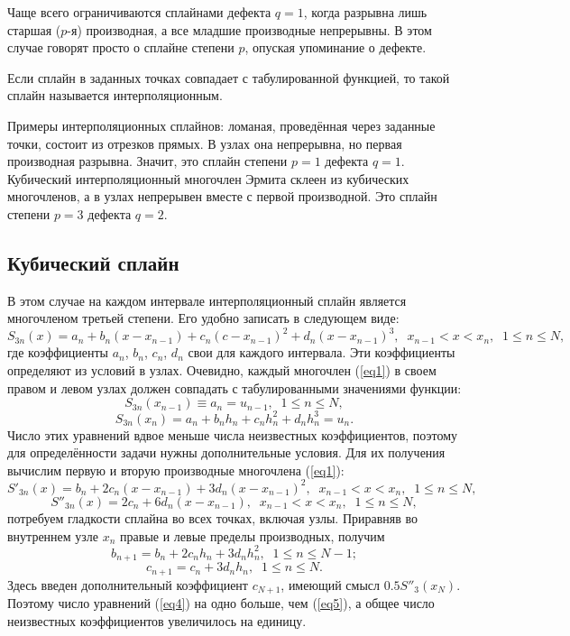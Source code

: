 \documentclass[
11pt,
master, %
subf, %
href, %
colorlinks=true, %
times, %
]{disser}
\begin{document}
Чаще всего ограничиваются сплайнами дефекта $q = 1$, когда разрывна лишь старшая ($p$-я) производная, а все младшие производные непрерывны. В этом случае говорят просто о сплайне степени $p$, опуская упоминание о дефекте.

Если сплайн в заданных точках совпадает с табулированной функцией, то такой сплайн называется интерполяционным.

Примеры интерполяционных сплайнов: ломаная, проведённая через заданные точки, состоит из отрезков прямых.
В узлах она непрерывна, но первая производная разрывна. Значит, это сплайн степени $p =1$ дефекта $q = 1$. Кубический интерполяционный многочлен Эрмита склеен из кубических многочленов, а в узлах непрерывен вместе с первой производной. Это сплайн степени $p = 3$ дефекта $q = 2$.

\subsection{Кубический сплайн}
В этом случае на каждом интервале интерполяционный сплайн является многочленом третьей степени. Его удобно записать в следующем виде:
\begin{equation}\label{eq1}
  S_{3n}(x) = a_n + b_n(x-x_{n-1}) + c_n(c-x_{n-1})^2 + d_n(x-x_{n-1})^3,\;\;x_{n-1}<x<x_n,\;\;1\leq n\leq N,
\end{equation}
где коэффициенты $a_n$, $b_n$, $c_n$, $d_n$ свои для каждого интервала. Эти коэффициенты определяют из условий в узлах. Очевидно, каждый многочлен (\ref{eq1}) в своем правом и левом узлах должен совпадать с табулированными значениями функции:
\begin{equation}\label{eq2}
  S_{3n}(x_{n-1}) \equiv a_n = u_{n-1},\;\;1\leq n\leq N,
\end{equation}
\begin{equation}\label{eq3}
  S_{3n}(x_n) =  a_n + b_n h_n + c_n h_n^2 + d_n h_n^3 = u_n.
\end{equation}
Число этих уравнений вдвое меньше числа неизвестных коэффициентов, поэтому для определённости задачи нужны дополнительные условия. Для их получения вычислим первую и вторую производные многочлена (\ref{eq1}):
$$S'_{3n}(x) = b_n +2c_n(x-x_{n-1}) + 3d_n(x-x_{n-1})^2,\;\;x_{n-1}<x<x_n,\;\; 1\leq n\leq N,$$
$$S''_{3n}(x) = 2c_n + 6d_n(x-x_{n-1}),\;\;x_{n-1}<x<x_n,\;\; 1\leq n\leq N,$$
потребуем гладкости сплайна во всех точках, включая узлы. Приравняв во внутреннем узле $x_n$ правые и левые пределы производных, получим
\begin{equation}\label{eq4}
  b_{n+1} = b_n + 2c_n h_n + 3d_nh_n^2,\;\;1\leq n\leq N-1;
\end{equation}
\begin{equation}\label{eq5}
  c_{n+1} = c_n + 3d_n h_n,\;\;1\leq n\leq N.
\end{equation}
Здесь введен дополнительный коэффициент $c_{N+1}$, имеющий смысл $0.5 S''_3(x_N)$. Поэтому число уравнений (\ref{eq4}) на одно больше, чем (\ref{eq5}), а общее число неизвестных коэффициентов увеличилось на единицу.
\end{document}
